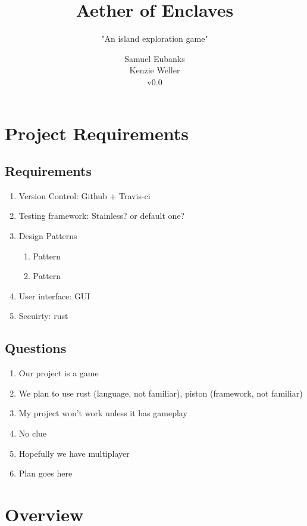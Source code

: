 \documentclass[a4paper]{scrreprt}
\title{Aether of Enclaves}
\subtitle{"An island exploration game"}
\author{
Samuel Eubanks\\
Kenzie Weller\\
v0.0
}
\begin{document}
\maketitle

\tableofcontents


\chapter{Project Requirements}

\section{Requirements}
\begin{enumerate}
   \item Version Control: Github + Travis-ci
   \item Testing framework: Stainless? or default one?
   \item Design Patterns
   \begin{enumerate}
     \item Pattern
     \item Pattern
   \end{enumerate}
   \item User interface: GUI
   \item Secuirty: rust
\end{enumerate}

 \section{Questions}
 \begin{enumerate}
   \item Our project is a game
   \item We plan to use rust (language, not familiar), piston (framework, not familiar)
   \item My project won't work unless it has gameplay
   \item No clue
   \item Hopefully we have multiplayer
   \item Plan goes here
 \end{enumerate}





\chapter{Overview}
\end{document}
